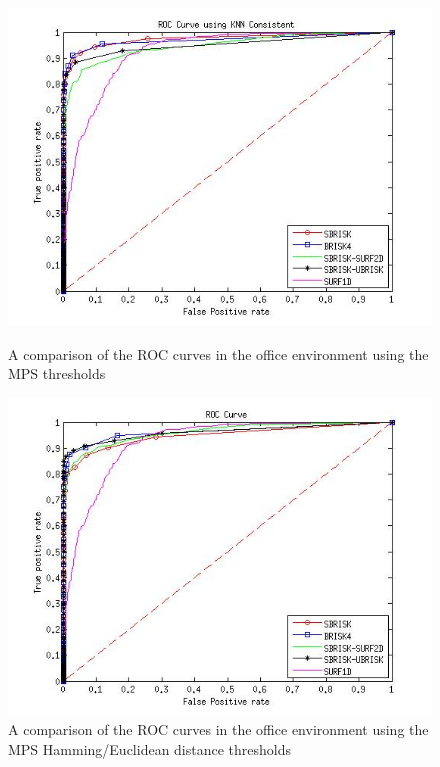 \documentclass[11pt]{report}
\begin{document}



\begin{figure}[h!]
\begin{minipage}[b]{0.5\linewidth}
\includegraphics[scale=0.4]{../Drawings/dataset2_ROC_General_KNN.jpg}
\caption{A comparison of the ROC curves in the office environment using the MPS thresholds}
\label{fig:compareKnnOffice}
\end{minipage}
\hspace{0.5cm}
\begin{minipage}[b]{0.5\linewidth}
\includegraphics[scale=0.4]{../Drawings/dataset2_ROC_General_Hamming.jpg}
\caption{A comparison of the ROC curves in the office environment using the MPS Hamming/Euclidean distance thresholds}
\label{fig:compareHammingOffice}
\end{minipage}

\end{figure}
\end{document}

